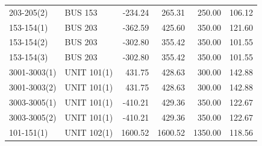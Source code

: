 \documentclass[10pt]{report}
\begin{document}
\begin{table}[H]
{\begin{tabular}{llrrrr}
203-205(2) & BUS 153 & -234.24 & 265.31 & 250.00 & 106.12 \\
153-154(1) & BUS 203 & -362.59 & 425.60 & 350.00 & 121.60 \\
153-154(2) & BUS 203 & -302.80 & 355.42 & 350.00 & 101.55 \\
153-154(3) & BUS 203 & -302.80 & 355.42 & 350.00 & 101.55 \\
3001-3003(1) & UNIT 101(1) & 431.75 & 428.63 & 300.00 & 142.88 \\
3001-3003(2) & UNIT 101(1) & 431.75 & 428.63 & 300.00 & 142.88 \\
3003-3005(1) & UNIT 101(1) & -410.21 & 429.36 & 350.00 & 122.67 \\
3003-3005(2) & UNIT 101(1) & -410.21 & 429.36 & 350.00 & 122.67 \\
101-151(1) & UNIT 102(1) & 1600.52 & 1600.52 & 1350.00 & 118.56 \\
\bottomrule
\end{tabular}}
\end{table}
\end{document}

